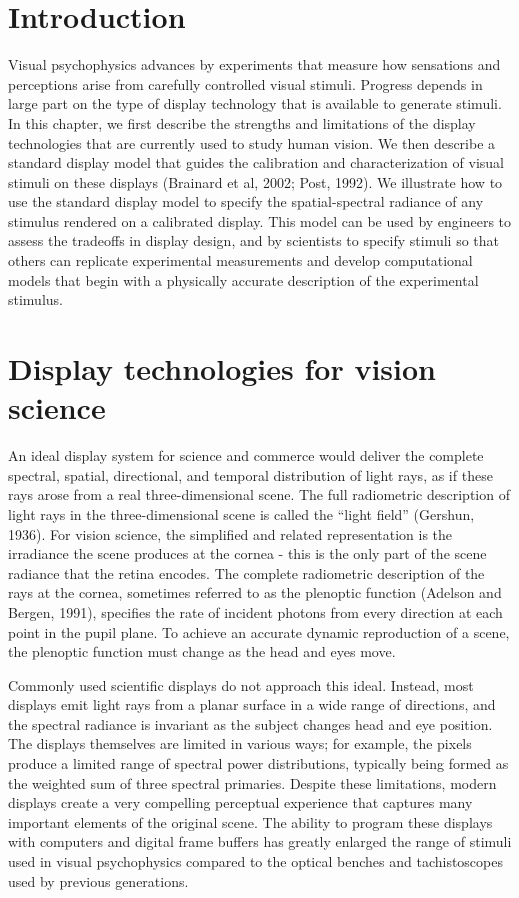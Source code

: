 \documentclass[
  letterpaper,
]{book}
\begin{document}
\section{Introduction}\label{introduction}

Visual psychophysics advances by experiments that measure how sensations
and perceptions arise from carefully controlled visual stimuli. Progress
depends in large part on the type of display technology that is
available to generate stimuli. In this chapter, we first describe the
strengths and limitations of the display technologies that are currently
used to study human vision. We then describe a standard display model
that guides the calibration and characterization of visual stimuli on
these displays (Brainard et al, 2002; Post, 1992). We illustrate how to
use the standard display model to specify the spatial-spectral radiance
of any stimulus rendered on a calibrated display. This model can be used
by engineers to assess the tradeoffs in display design, and by
scientists to specify stimuli so that others can replicate experimental
measurements and develop computational models that begin with a
physically accurate description of the experimental stimulus.

\section{Display technologies for vision
science}\label{display-technologies-for-vision-science}

An ideal display system for science and commerce would deliver the
complete spectral, spatial, directional, and temporal distribution of
light rays, as if these rays arose from a real three-dimensional scene.
The full radiometric description of light rays in the three-dimensional
scene is called the ``light field'' (Gershun, 1936). For vision science,
the simplified and related representation is the irradiance the scene
produces at the cornea - this is the only part of the scene radiance
that the retina encodes. The complete radiometric description of the
rays at the cornea, sometimes referred to as the plenoptic function
(Adelson and Bergen, 1991), specifies the rate of incident photons from
every direction at each point in the pupil plane. To achieve an accurate
dynamic reproduction of a scene, the plenoptic function must change as
the head and eyes move.

Commonly used scientific displays do not approach this ideal. Instead,
most displays emit light rays from a planar surface in a wide range of
directions, and the spectral radiance is invariant as the subject
changes head and eye position. The displays themselves are limited in
various ways; for example, the pixels produce a limited range of
spectral power distributions, typically being formed as the weighted sum
of three spectral primaries. Despite these limitations, modern displays
create a very compelling perceptual experience that captures many
important elements of the original scene. The ability to program these
displays with computers and digital frame buffers has greatly enlarged
the range of stimuli used in visual psychophysics compared to the
optical benches and tachistoscopes used by previous generations.
\end{document}
